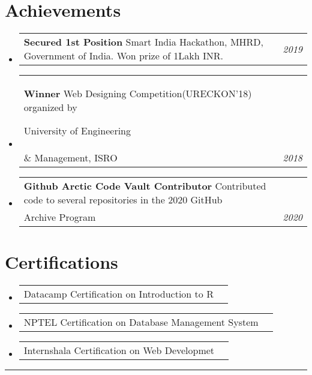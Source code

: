 \documentclass[a4paper,11pt]{article}
\makeatletter
\newcommand{\resumePOR}[3]{
    \vspace{0.5mm}\item
    \begin{tabular*}{0.97\textwidth}[t]{l@{\extracolsep{\fill}}r}
        \textbf{#1}\hspace{0.3mm}#2 & \textit{\small{#3}}
    \end{tabular*}
    \vspace{-2mm}
}
\newcommand{\resumeSubHeadingListStart}{\begin{itemize}[leftmargin=*,labelsep=0mm]}
\newcommand{\resumeSubHeadingListEnd}{\end{itemize}\vspace{2mm}}
\makeatother
\begin{document}
\section{Achievements}
\vspace{-0.4mm}
\resumeSubHeadingListStart
\resumePOR{Secured 1st Position } %
{Smart India Hackathon, MHRD, Government of India. Won prize of 1Lakh INR. } %
{2019} %

\resumePOR{Winner } %
{Web Designing Competition(URECKON'18) organized by

University of Engineering \\ \& Management, ISRO} %
{2018} %

\resumePOR{Github Arctic Code Vault Contributor } %
{Contributed code to several repositories in the 2020 GitHub \\ Archive Program} %
{2020} %

\resumeSubHeadingListEnd
\vspace{-4mm}

\section{Certifications}
\vspace{-0.2mm}
\resumeSubHeadingListStart
\resumePOR{}{
Datacamp Certification on Introduction to R
}{}

\resumePOR{}{
NPTEL Certification on Database Management System
}{}
\resumePOR{}{
Internshala Certification on Web Developmet
}{}
\resumeSubHeadingListEnd



\hspace*{-5mm}\rule{1.035\textwidth}{0.1mm}

\end{document}
